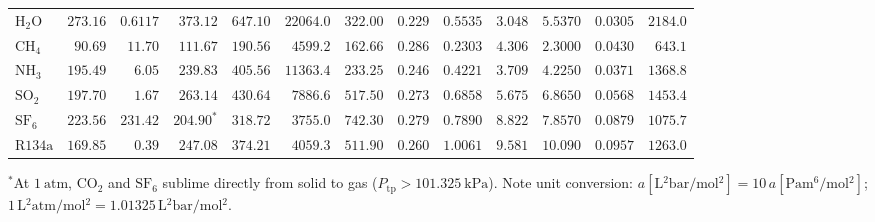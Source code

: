 \begin{table}[!htbp]
\begin{tabularx}{\linewidth}{@{}l r r r r r r r r r r r r@{}}
$\mathrm{H_2O}$ & $273.16$ & $0.6117$ & $373.12$ & $647.10$ & $22064.0$ & $322.00$ & $0.229$ & $0.5535$ & $3.048$ & $5.5370$ & $0.0305$ & $2184.0$ \\
$\mathrm{CH_4}$ & $90.69$ & $11.70$ & $111.67$ & $190.56$ & $4599.2$ & $162.66$ & $0.286$ & $0.2303$ & $4.306$ & $2.3000$ & $0.0430$ & $643.1$ \\
$\mathrm{NH_3}$ & $195.49$ & $6.05$ & $239.83$ & $405.56$ & $11363.4$ & $233.25$ & $0.246$ & $0.4221$ & $3.709$ & $4.2250$ & $0.0371$ & $1368.8$ \\
$\mathrm{SO_2}$ & $197.70$ & $1.67$ & $263.14$ & $430.64$ & $7886.6$ & $517.50$ & $0.273$ & $0.6858$ & $5.675$ & $6.8650$ & $0.0568$ & $1453.4$ \\
$\mathrm{SF_6}$ & $223.56$ & $231.42$ & $204.90^*$ & $318.72$ & $3755.0$ & $742.30$ & $0.279$ & $0.7890$ & $8.822$ & $7.8570$ & $0.0879$ & $1075.7$ \\
$\mathrm{R134a}$ & $169.85$ & $0.39$ & $247.08$ & $374.21$ & $4059.3$ & $511.90$ & $0.260$ & $1.0061$ & $9.581$ & $10.090$ & $0.0957$ & $1263.0$ \\
\bottomrule
\end{tabularx}
\par\vspace{1pt}\raggedright{\scriptsize $^*$At $\SI{1}{\text{atm}}$, $\mathrm{CO_2}$ and $\mathrm{SF_6}$ sublime directly from solid to gas ($P_{\mathrm{tp}} > \SI{101.325}{\kilo\pascal}$). Note unit conversion: $a[\si{\liter^2\bar\per\mole^2}] = 10\,a[\si{\pascal\meter^6\per\mole^2}]$; $1\,\si{\liter^2\text{atm}\per\mole^2} = 1.01325\,\si{\liter^2\bar\per\mole^2}$.}
\end{table}

